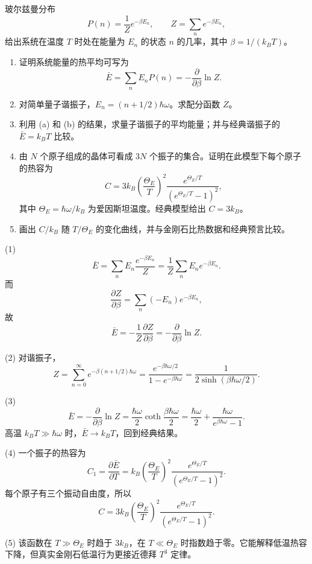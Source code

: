 \begin{question}
玻尔兹曼分布
\[
P(n)=\frac{1}{Z}e^{-\beta E_n},\qquad Z=\sum_n e^{-\beta E_n},
\]
给出系统在温度 $T$ 时处在能量为 $E_n$ 的状态 $n$ 的几率，其中 $\beta=1/(k_BT)$。
\begin{enumerate}
\item 证明系统能量的热平均可写为
\[
\bar E=\sum_n E_nP(n)=-\frac{\partial}{\partial\beta}\ln Z .
\]
\item 对简单量子谐振子，$E_n=(n+1/2)\hbar\omega$。求配分函数 $Z$。
\item 利用 (a) 和 (b) 的结果，求量子谐振子的平均能量；并与经典谐振子的 $\bar E=k_BT$ 比较。
\item 由 $N$ 个原子组成的晶体可看成 $3N$ 个振子的集合。证明在此模型下每个原子的热容为
\[
C=3k_B\left(\frac{\Theta_E}{T}\right)^2\frac{e^{\Theta_E/T}}{(e^{\Theta_E/T}-1)^2},
\]
其中 $\Theta_E=\hbar\omega/k_B$ 为爱因斯坦温度。经典模型给出 $C=3k_B$。
\item 画出 $C/k_B$ 随 $T/\Theta_E$ 的变化曲线，并与金刚石比热数据和经典预言比较。
\end{enumerate}
\end{question}
\begin{solution}
(1) 
\[
\bar E=\sum_nE_n\frac{e^{-\beta E_n}}{Z}
=\frac1Z\sum_nE_ne^{-\beta E_n}.
\]
而
\[
\frac{\partial Z}{\partial\beta}=\sum_n(-E_n)e^{-\beta E_n},
\]
故
\[
\bar E=-\frac1Z\frac{\partial Z}{\partial\beta}
=-\frac{\partial}{\partial\beta}\ln Z.
\]

(2) 对谐振子，
\[
Z=\sum_{n=0}^{\infty}e^{-\beta(n+1/2)\hbar\omega}
=\frac{e^{-\beta\hbar\omega/2}}{1-e^{-\beta\hbar\omega}}
=\frac1{2\sinh(\beta\hbar\omega/2)}.
\]

(3) 
\[
\bar E=-\frac{\partial}{\partial\beta}\ln Z
=\frac{\hbar\omega}{2}\coth\frac{\beta\hbar\omega}{2}
=\frac{\hbar\omega}{2}+\frac{\hbar\omega}{e^{\beta\hbar\omega}-1}.
\]
高温 $k_BT\gg\hbar\omega$ 时，$\bar E\to k_BT$，回到经典结果。

(4) 一个振子的热容为
\[
C_1=\frac{\partial\bar E}{\partial T}
=k_B\left(\frac{\Theta_E}{T}\right)^2
\frac{e^{\Theta_E/T}}{(e^{\Theta_E/T}-1)^2}.
\]
每个原子有三个振动自由度，所以
\[
C=3k_B\left(\frac{\Theta_E}{T}\right)^2
\frac{e^{\Theta_E/T}}{(e^{\Theta_E/T}-1)^2}.
\]

(5) 该函数在 $T\gg\Theta_E$ 时趋于 $3k_B$，在 $T\ll\Theta_E$ 时指数趋于零。它能解释低温热容下降，但真实金刚石低温行为更接近德拜 $T^3$ 定律。
\end{solution}

